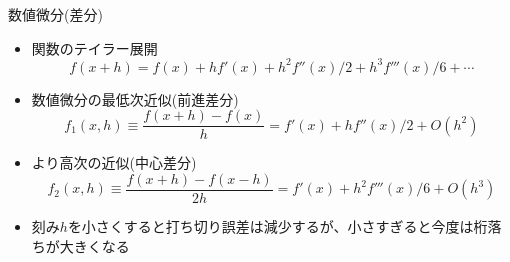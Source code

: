\begin{frame}[t,fragile]{数値微分(差分)}
  \begin{itemize}
    \setlength{\itemsep}{1em}
  \item 関数のテイラー展開
    \[
    f(x+h) = f(x) + h f'(x) + h^2 f''(x)/2 + h^3 f'''(x)/6 + \cdots
    \]
  \item 数値微分の最低次近似(前進差分)
    \[
    f_1(x,h) \equiv \frac{f(x+h)-f(x)}{h} = f'(x) + h f''(x)/2 + O(h^2)
    \]
  \item より高次の近似(中心差分)
    \[
    f_2(x,h) \equiv \frac{f(x+h)-f(x-h)}{2h} = f'(x) + h^2 f'''(x)/6 + O(h^3)
    \]
  \item 刻み$h$を小さくすると打ち切り誤差は減少するが、小さすぎると今度は桁落ちが大きくなる
  \end{itemize}
\end{frame}
